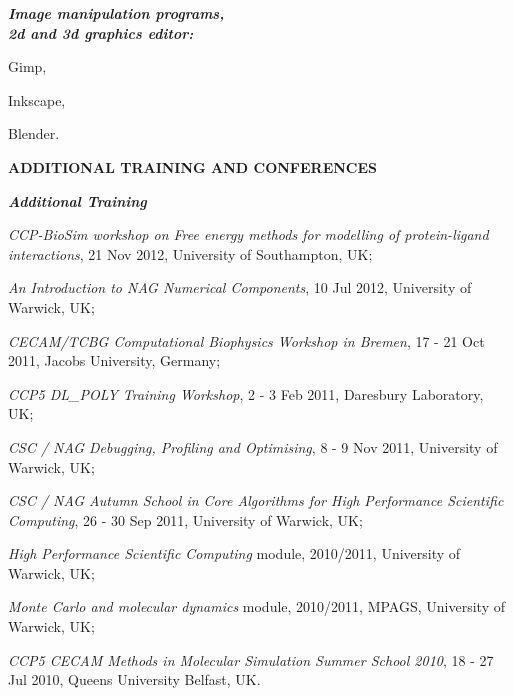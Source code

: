 \documentclass[a4paper,10pt,final]{memoir}
\newcommand{\Sep}{\vspace{1.em}}
\newcommand{\SmallSep}{\vspace{0.3em}}
\newcommand{\CVSection}[1]
	{\Large\textbf{#1}\par
	\SmallSep\normalsize\normalfont}
\newcommand{\CVItem}[2]
	{\textit{\textbf{\color{RoyalBlue} #1}} #2}
\begin{document}
\begin{multicols}{3}
\CVItem{Image manipulation programs,\\2d and 3d graphics editor:\hfill}
\begin{compactitem}[\color{RoyalBlue}$\circ$]
\item Gimp,
\item Inkscape,
\item Blender.
\end{compactitem}

\end{multicols}


\setlength{\plitemsep}{0.7pt}
\setlength{\pltopsep}{2.5pt}


\Sep
\CVSection{ADDITIONAL TRAINING AND CONFERENCES} 
\CVItem{Additional Training} 
\begin{compactitem}[\color{RoyalBlue}$\circ$]
\item \textit{CCP-BioSim workshop on Free energy methods for modelling of protein-ligand
  interactions}, 21 Nov 2012, University of Southampton, UK;
\item \textit{An Introduction to NAG Numerical Components}, 10 Jul 2012, University of Warwick, UK;
\item \textit{CECAM/TCBG Computational Biophysics Workshop in Bremen},  17 - 21 Oct 2011, Jacobs University, Germany;  
\item \textit{CCP5 DL\_POLY Training Workshop}, 2 - 3 Feb 2011, Daresbury
Laboratory, UK;
\item \textit{CSC / NAG Debugging, Profiling and Optimising},  8 - 9 Nov 2011, University of
  Warwick, UK;
\item \textit{CSC / NAG Autumn School in Core Algorithms for High Performance Scientific
  Computing}, 26 - 30 Sep 2011, University of Warwick, UK;
\item \textit{High Performance Scientific Computing} module, 2010/2011, University of Warwick, UK;
\item \textit{Monte Carlo and molecular dynamics} module, 2010/2011, MPAGS, University of Warwick, UK;
\item \textit{CCP5 CECAM Methods in Molecular Simulation Summer School 2010}, 18 - 27 Jul 2010, Queens University
  Belfast, UK.
\end{compactitem}
\SmallSep
\end{document}

